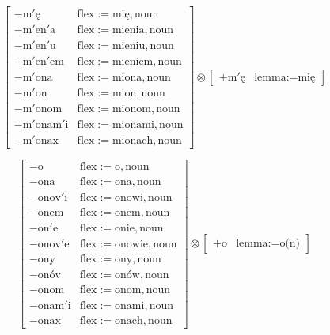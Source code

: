 \documentclass{article}
\begin{document}
\begin{scriptsize}\[
\left[\begin{array}{ll}
-\text{m$'$ę} & \text{flex}:=\text{mię}, \text{noun}\\
-\text{m$'$en$'$a} & \text{flex}:=\text{mienia}, \text{noun}\\
-\text{m$'$en$'$u} & \text{flex}:=\text{mieniu}, \text{noun}\\
-\text{m$'$en$'$em} & \text{flex}:=\text{mieniem}, \text{noun}\\
-\text{m$'$ona} & \text{flex}:=\text{miona}, \text{noun}\\
-\text{m$'$on} & \text{flex}:=\text{mion}, \text{noun}\\
-\text{m$'$onom} & \text{flex}:=\text{mionom}, \text{noun}\\
-\text{m$'$onam$'$i} & \text{flex}:=\text{mionami}, \text{noun}\\
-\text{m$'$onax} & \text{flex}:=\text{mionach}, \text{noun}
\end{array}\right] \otimes \left[\begin{array}{ll}
+\text{m$'$ę} & \text{lemma}:=\text{mię}
\end{array}\right]
\]\end{scriptsize}

\begin{scriptsize}\[
\left[\begin{array}{ll}
-\text{o} & \text{flex}:=\text{o}, \text{noun}\\
-\text{ona} & \text{flex}:=\text{ona}, \text{noun}\\
-\text{onov$'$i} & \text{flex}:=\text{onowi}, \text{noun}\\
-\text{onem} & \text{flex}:=\text{onem}, \text{noun}\\
-\text{on$'$e} & \text{flex}:=\text{onie}, \text{noun}\\
-\text{onov$'$e} & \text{flex}:=\text{onowie}, \text{noun}\\
-\text{ony} & \text{flex}:=\text{ony}, \text{noun}\\
-\text{onóv} & \text{flex}:=\text{onów}, \text{noun}\\
-\text{onom} & \text{flex}:=\text{onom}, \text{noun}\\
-\text{onam$'$i} & \text{flex}:=\text{onami}, \text{noun}\\
-\text{onax} & \text{flex}:=\text{onach}, \text{noun}
\end{array}\right] \otimes \left[\begin{array}{ll}
+\text{o} & \text{lemma}:=\text{o(n)}
\end{array}\right]
\]\end{scriptsize}
\end{document}
